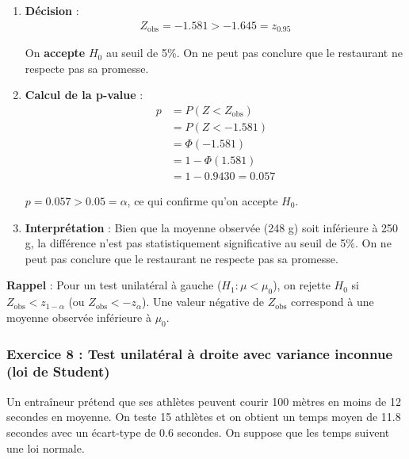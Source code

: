 \documentclass[11pt,a4paper]{article}
\begin{document}
\begin{enumerate}
    Dans la table normale : $\Phi(1.645) = 0.95$, donc $P(Z < -1.645) = 0.05$
    
    \item \textbf{Décision} :
    \begin{align*}
    Z_{\text{obs}} = -1.581 > -1.645 = z_{0.95}
    \end{align*}
    
    On \textbf{accepte} $H_0$ au seuil de 5\%. On ne peut pas conclure que le restaurant ne respecte pas sa promesse.
    
    \item \textbf{Calcul de la p-value} :
    \begin{align*}
    p &= P(Z < Z_{\text{obs}}) \\
    &= P(Z < -1.581) \\
    &= \Phi(-1.581) \\
    &= 1 - \Phi(1.581) \\
    &= 1 - 0.9430 = 0.057
    \end{align*}
    
    $p = 0.057 > 0.05 = \alpha$, ce qui confirme qu'on accepte $H_0$.
    
    \item \textbf{Interprétation} : Bien que la moyenne observée (248 g) soit inférieure à 250 g, la différence n'est pas statistiquement significative au seuil de 5\%. On ne peut pas conclure que le restaurant ne respecte pas sa promesse.
\end{enumerate}

\begin{rappelbox}
\textbf{Rappel} : Pour un test unilatéral à gauche ($H_1 : \mu < \mu_0$), on rejette $H_0$ si $Z_{\text{obs}} < z_{1-\alpha}$ (ou $Z_{\text{obs}} < -z_{\alpha}$). Une valeur négative de $Z_{\text{obs}}$ correspond à une moyenne observée inférieure à $\mu_0$.
\end{rappelbox}

\newpage

\subsubsection{Exercice 8 : Test unilatéral à droite avec variance inconnue (loi de Student)}

Un entraîneur prétend que ses athlètes peuvent courir 100 mètres en moins de 12 secondes en moyenne. On teste 15 athlètes et on obtient un temps moyen de 11.8 secondes avec un écart-type de 0.6 secondes. On suppose que les temps suivent une loi normale.
\end{document}
